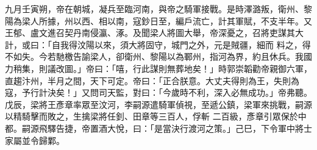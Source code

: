 \begin{pinyinscope}
 九月壬寅朔，帝在朝城，凝兵至臨河南，與帝之騎軍接戰。是時澤潞叛，衛州、黎陽為梁人所據，州以西、相以南，寇鈔日至，編戶流亡，計其軍賦，不支半年。又王郁、盧文進召契丹南侵瀛、涿。及聞梁人將圖大舉，帝深憂之，召將吏謀其大計，或曰：「自我得汶陽以來，須大將固守，城門之外，元是賊疆，細而
 料之，得不如失。今若馳檄告諭梁人，卻衛州、黎陽以為鄆州，指河為界，約且休兵。我國力稍集，則議改圖。」帝曰：「嘻，行此謀則無葬地矣！」時郭崇韜勸帝親御六軍，直趨汴州，半月之間，天下可定。帝曰：「正合朕意。大丈夫得則為王，失則為寇，予行計決矣！」又問司天監，對曰：「今歲時不利，深入必無成功。」帝弗聽。戊辰，梁將王彥章率眾至汶河，李嗣源遣騎軍偵視，至遞公鎮，梁軍來挑戰，嗣源以精騎擊而敗之，生擒梁將任釗、田章等三百人，俘斬
 二百級，彥章引眾保於中都。嗣源飛驛告捷，帝置酒大悅，曰：「是當決行渡河之策。」己巳，下令軍中將士家屬並令歸鄴。



\end{pinyinscope}